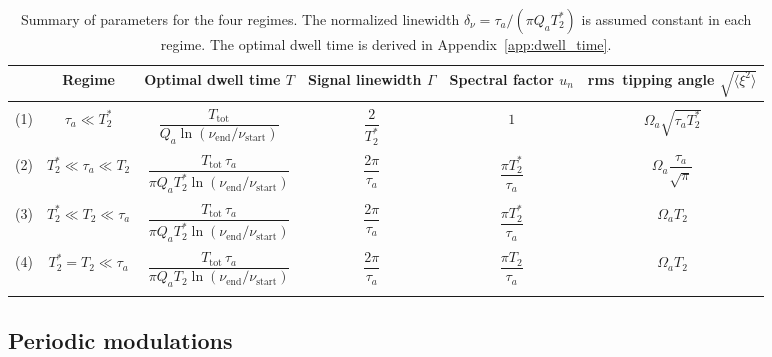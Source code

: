 \begin{table}[ht]
    \centering
    \caption{Summary of parameters for the four regimes.
    The normalized linewidth $\delta_\nu = \tau_a/(\pi Q_a T_2^*)$ is assumed constant in each regime.
    The optimal dwell time is derived in Appendix~\ref{app:dwell_time}.}
    \begin{tabular}{cccccc}
        \hline
        & Regime & Optimal dwell time $T$ & Signal linewidth $\Gamma$ & Spectral factor $u_n$ & rms\ tipping angle $\sqrt{\langle \xi^2\rangle}$ \\
        \hline
        & & & & & \\
        (1) & $\tau_a \ll T_2^*$
            & $\dfrac{T_{\mathrm{tot}}}{Q_a \ln\left( \nu_{\mathrm{end}}/\nu_{\mathrm{start}} \right)}$
            & $\dfrac{2}{T_2^*}$ & $1$ & $\Omega_{a}\sqrt{\tau_a T_2^*}$\\
        & & & & & \\
        (2) & $T_2^* \ll \tau_a \ll T_2$
            & $\dfrac{T_{\mathrm{tot}}\,\tau_a}{\pi Q_a T_2^*\ln\left( \nu_{\mathrm{end}}/\nu_{\mathrm{start}} \right)}$
            & $\dfrac{2\pi}{\tau_a}$ & $\dfrac{\pi T_2^*}{\tau_a}$ & $\Omega_a\dfrac{\tau_a}{\sqrt{\pi}}$ \\
        & & & & & \\
        (3) & $T_2^* \ll T_2 \ll \tau_a$
            & $\dfrac{T_{\mathrm{tot}}\,\tau_a}{\pi Q_a T_2^*\ln\left( \nu_{\mathrm{end}}/\nu_{\mathrm{start}} \right)}$
            & $\dfrac{2\pi}{\tau_a}$ & $\dfrac{\pi T_2^*}{\tau_a}$ & $\Omega_a T_2$\\
        & & & & & \\
        (4) & $T_2^*=T_2 \ll \tau_a$
            & $\dfrac{T_{\mathrm{tot}}\,\tau_a}{\pi Q_a T_2\ln\left(\nu_{\mathrm{end}}/\nu_{\mathrm{start}}\right)}$
            & $\dfrac{2\pi}{\tau_a}$ & $\dfrac{\pi T_2}{\tau_a}$ & $\Omega_a T_2$ \\
        & & & & & \\
        \hline
    \end{tabular}
    \label{tab:summary_of_regimes}
\end{table}


\subsection{Periodic modulations}


